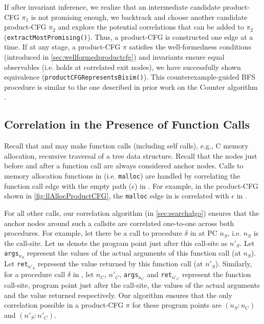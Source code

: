 If after invariant inference, we realize that an intermediate candidate product-CFG $\pi_1$
is not promising enough, we backtrack and choose another candidate product-CFG $\pi_2$
and explore the potential correlations that can be added to $\pi_2$ ({\tt extractMostPromising()}).
Thus, a product-CFG is constructed one edge at a time.
If at any stage, a product-CFG $\pi$ satisfies the well-formedness conditions (introduced in \cref{sec:wellformedproductcfg})
and invariants ensure equal observables (i.e. \post{} holds at correlated exit nodes),
we have successfully shown equivalence ({\tt productCFGRepresentsBisim()}).
This counterexample-guided BFS procedure is similar to the one described in prior work on
the Counter algorithm \cite{oopsla20}.

\subsection{Correlation in the Presence of Function Calls}
\label{sec:correlfcalls}
Recall that \sprog{} and \cprog{} may make function calls (including self calls),
e.g., C memory allocation, recursive traversal of a tree data structure.
Recall that the nodes just before and after a function call are always considered anchor nodes.
Calls to memory allocation functions in \cprog{} (i.e. {\tt malloc}) are handled by correlating
the function call edge with the empty path ($\epsilon$) in \sprog{}.
For example, in the product-CFG shown in \cref{fig:llAllocProductCFG}, the {\tt malloc} edge  in \cprog{}
is correlated with $\epsilon$ in \sprog{}.

For all other calls, our correlation algorithm (in \cref{sec:searchalgo}) ensures that the anchor nodes
around such a callsite are correlated one-to-one across both procedures.
For example, let there be a call to procedure $\delta$ in \sprog{} at PC $n_S$, i.e. $n_S$ is the call-site.
Let us denote the program point just after this call-site as $n'_S$.
Let {\tt args}$_{n_S}$ represent the values of the actual arguments of this function call (at $n_S$).
Let {\tt ret}$_{n'_S}$ represent the value returned by this function call (at $n'_S$).
Similarly, for a procedure call $\delta$ in \cprog{}, let $n_C$, $n'_C$, {\tt args}$_{n_C}$ and {\tt ret}$_{n'_C}$
represent the function call-site, program point just after the call-site,
the values of the actual arguments and the value returned respectively.
Our algorithm ensures that the only correlation possible in a product-CFG $\pi$ for these program points are
$(n_S:n_C)$ and $(n'_S:n'_C)$.

